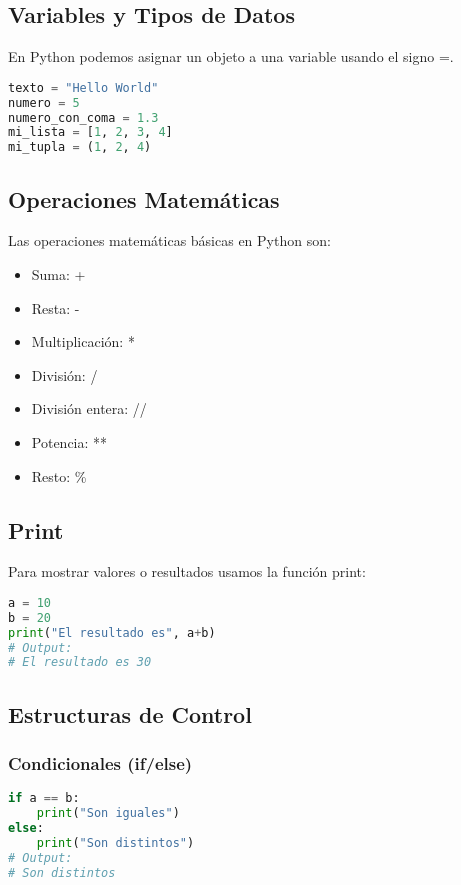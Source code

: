 \documentclass[12pt]{article}
\begin{document}
\subsection{Variables y Tipos de Datos}
En Python podemos asignar un objeto a una variable usando el signo =.

\begin{lstlisting}[language=Python]
texto = "Hello World"
numero = 5
numero_con_coma = 1.3
mi_lista = [1, 2, 3, 4]
mi_tupla = (1, 2, 4)
\end{lstlisting}

\subsection{Operaciones Matemáticas}
Las operaciones matemáticas básicas en Python son:
\begin{itemize}
    \item Suma: +
    \item Resta: -
    \item Multiplicación: *
    \item División: /
    \item División entera: //
    \item Potencia: **
    \item Resto: \%
\end{itemize}

\subsection{Print}
Para mostrar valores o resultados usamos la función print:

\begin{lstlisting}[language=Python]
a = 10
b = 20
print("El resultado es", a+b)
# Output:
# El resultado es 30
\end{lstlisting}

\subsection{Estructuras de Control}
\subsubsection{Condicionales (if/else)}
\begin{lstlisting}[language=Python]
if a == b:
    print("Son iguales")
else:
    print("Son distintos")
# Output:
# Son distintos
\end{lstlisting}
\end{document}
